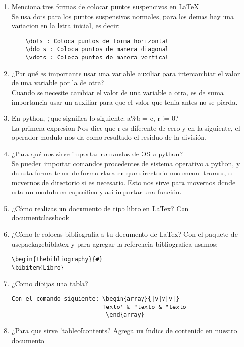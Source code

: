 \documentclass{book}
\begin{document}
\begin{enumerate}
	
	\item Menciona tres formas de colocar puntos suspencivos en LaTeX\\
	Se usa dots para los puntos suspensivos normales, para los demas hay una variacion en la letra inicial, es decir:
	\begin{verbatim} 
    \dots : Coloca puntos de forma horizontal
    \ddots : Coloca puntos de manera diagonal
    \vdots : Coloca puntos de manera vertical
	\end{verbatim}	
	\item ¿Por qué es importante usar una variable auxiliar para intercambiar el valor de una variable por la de otra?\\
	Cuando se necesite cambiar el valor de una variable a otra, es
	de suma importancia usar un auxiliar para que el valor que tenia
	antes no se pierda.
	
	\item En python, ¿que significa lo siguiente: a\%b = c, r != 0?\\
	La primera expresion Nos dice que r es diferente de cero y en la siguiente, el operador modulo nos da como resultado el residuo de la división.
	\item ¿Para qué nos sirve importar comandos de OS a python?\\
	Se pueden importar comandos procedentes de sistema operativo a python, y
	de esta forma tener de forma clara en que directorio nos encon-
	tramos, o movernos de directorio si es necesario. Esto nos sirve
	para movernos donde esta un modulo en especifico y asi importar
	una función.
	\item ¿Cómo realizas un documento de tipo libro en LaTex?
	Con documentclass{book}
	\item ¿Cómo le colocas bibliografia a tu documento de LaTex?
	Con el paquete de usepackage{biblatex} y para agregar la referencia bibliografica usamos: \begin{verbatim}
\begin{thebibliography}{#}
\bibitem{Libro}
	\end{verbatim}
	\item ¿Como dibijas una tabla?
	\begin{verbatim}
Con el comando siguiente: \begin{array}{|v|v|v|}
                          Texto" & "texto & "texto
                           \end{array}
	\end{verbatim}
	\item ¿Para que sirve "tableofcontents?
	Agrega un índice de contenido en nuestro documento
	

\end{enumerate}
\end{document}
